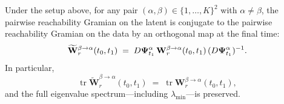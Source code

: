 \begin{theorem}\label{thm:supp-interareal-control-gram-inv}
Under the setup above, for any pair $(\alpha,\beta)\in\{1,\ldots,K\}^{2}$ with $\alpha\neq\beta$, the pairwise reachability Gramian on the latent is conjugate to the pairwise reachability Gramian on the data by an orthogonal map at the final time:
\begin{equation}
\widetilde{\mathbf{W}}_{r}^{\beta\to\alpha}(t_{0},t_{1}) \;=\; D\vb{\Psi}^{\alpha}_{t_{1}}\,\mathbf{W}_{r}^{\beta\to\alpha}(t_{0},t_{1})\,(D\vb{\Psi}^{\alpha}_{t_{1}})^{-1}.\label{eq:supp-interareal-control-gram-conj}
\end{equation}
In particular,
\begin{equation}
\operatorname{tr}\widetilde{\mathbf{W}}_{r}^{\beta\to\alpha}(t_{0},t_{1}) \;=\; \operatorname{tr}\mathbf{W}_{r}^{\beta\to\alpha}(t_{0},t_{1}),
\end{equation}
and the full eigenvalue spectrum---including $\lambda_{\min}$---is preserved.
\end{theorem}

